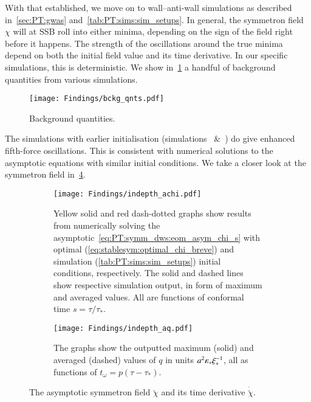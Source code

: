 With that established, we move on to wall--anti-wall simulations as described in~\cref{sec:PT:gwas} and~\cref{tab:PT:sims:sim_setups}. %
In general, the symmetron field $\chi$ will at SSB roll into either minima, depending on the sign of the field right before it happens. The strength of the oscillations around the true minima depend on both the initial field value and its time derivative. In our specific simulations, this is deterministic. %
We show in~\cref{fig:results:achi:bckg_qnts} a handful of background quantities from various simulations. %
\begin{figure}[h]
    \centering
    \texttt{[image: Findings/bckg\_qnts.pdf]}
    \caption{Background quantities. }
    \label{fig:results:achi:bckg_qnts}
\end{figure}
The simulations with earlier initialisation (simulations~ \&~) do give enhanced fifth-force oscillations. This is consistent with numerical solutions to the asymptotic equations with similar initial conditions. We take a closer look at the symmetron field in~\cref{fig:results:achi:indepth_achi_aq}. %


\begin{figure}[ht]
    \centering
    \begin{subfigure}[b]{\linewidth}
        \centering
        \texttt{[image: Findings/indepth\_achi.pdf]}
        \caption{Yellow solid and red dash-dotted graphs show results from numerically solving the asymptotic~\cref{eq:PT:symm_dws:eom_asym_chi_s} with optimal (\cref{eq:stablesym:optimal_chi_breve}) and simulation (\cref{tab:PT:sims:sim_setups}) initial conditions, respectively. The solid and dashed lines show respective simulation output, in form of maximum and averaged values. All are functions of conformal time $s=\tau/\tau_\ast$.}
        \label{fig:results:achi:indepth_achi}
    \end{subfigure}
    \hfill
    \begin{subfigure}[b]{\linewidth}
        \centering
        \texttt{[image: Findings/indepth\_aq.pdf]}
        \caption{The graphs show the outputted maximum (solid) and averaged (dashed) values of $q$ in units $a^2 \varepsilon_\ast \xi_\ast^{-1}$, all as functions of $t_\omega = p(\tau-\tau_\ast)$.}
        \label{fig:results:achi:indepth_aq}
    \end{subfigure}
    \caption{The asymptotic symmetron field $\breve{\chi}$ and its time derivative $\dot{\breve{\chi}}$.}
    \label{fig:results:achi:indepth_achi_aq}
\end{figure}


